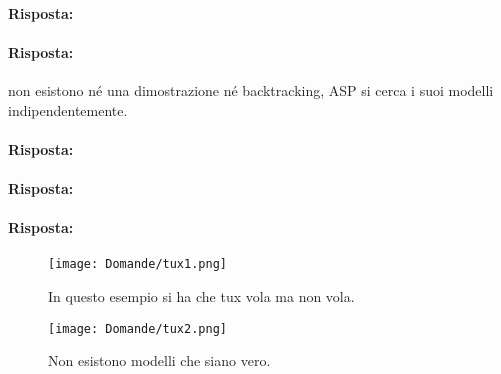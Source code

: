 
\paragraph{Risposta:}


\paragraph{Risposta:} non esistono né una dimostrazione né backtracking, ASP si cerca i suoi modelli indipendentemente.


\paragraph{Risposta:}


\paragraph{Risposta:}


\paragraph{Risposta:}


\begin{figure}[h]
    \centering
    \begin{minipage}{0.45\textwidth}
        \centering
        \texttt{[image: Domande/tux1.png]}
        \caption{In questo esempio si ha che tux vola ma non vola.}
    \end{minipage}
    \hfill
    \begin{minipage}{0.45\textwidth}
        \centering
        \texttt{[image: Domande/tux2.png]}
        \caption{Non esistono modelli che siano vero.}
    \end{minipage}
\end{figure}



